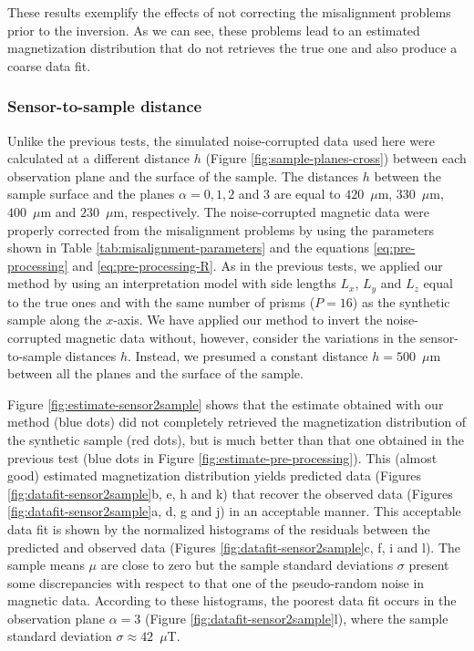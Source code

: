 \documentclass[galley,gc]{agutex}
\begin{document}
\begin{article}
These results exemplify the effects of not correcting the
misalignment problems prior to the inversion.
As we can see, these problems lead to an estimated magnetization 
distribution that do not retrieves the true one and also
produce a coarse data fit.

\subsubsection{Sensor-to-sample distance}

Unlike the previous tests, the simulated noise-corrupted 
data used here were calculated at a different distance $h$ 
(Figure \ref{fig:sample-planes-cross}) between each observation
plane and the surface of the sample.
The distances $h$ between the sample surface and the planes 
$\alpha = 0, 1, 2$ and $3$ are equal to $420$~$\mu$m, $330$~$\mu$m,
$400$~$\mu$m and $230$~$\mu$m, respectively.
The noise-corrupted magnetic data were properly corrected 
from the misalignment problems by using the parameters shown in 
Table \ref{tab:misalignment-parameters} and the equations 
\ref{eq:pre-processing} and \ref{eq:pre-processing-R}.
As in the previous tests, we applied our method by using
an interpretation model with side lengths $L_{x}$, $L_{y}$ 
and $L_{z}$ equal to the true ones and with the same number 
of prisms ($P = 16$) as the synthetic sample along the $x$-axis.
We have applied our method to invert the noise-corrupted magnetic 
data without, however, consider the variations in the 
sensor-to-sample distances $h$. Instead, we presumed a constant
distance $h = 500$~$\mu$m between all the planes and the surface
of the sample.

Figure \ref{fig:estimate-sensor2sample} shows that
the estimate obtained with our method (blue dots) did not
completely retrieved the magnetization distribution of the synthetic
sample (red dots), but is much better than that one obtained in the
previous test (blue dots in Figure \ref{fig:estimate-pre-processing}).
This (almost good) estimated magnetization distribution yields 
predicted data (Figures \ref{fig:datafit-sensor2sample}b, e, h and k) 
that recover the observed data (Figures \ref{fig:datafit-sensor2sample}a, 
d, g and j) in an acceptable manner.
This acceptable data fit is shown by the normalized histograms of 
the residuals between the predicted and
observed data (Figures \ref{fig:datafit-sensor2sample}c, f, i and l).
The sample means $\mu$ are close to zero but the sample standard 
deviations $\sigma$ present some discrepancies with respect to
that one of the pseudo-random noise in magnetic data.
According to these histograms, the poorest data fit occurs in the 
observation plane $\alpha = 3$ (Figure \ref{fig:datafit-sensor2sample}l),
where the sample standard deviation $\sigma \approx 42$~$\mu$T.


\end{article}
\end{document}
